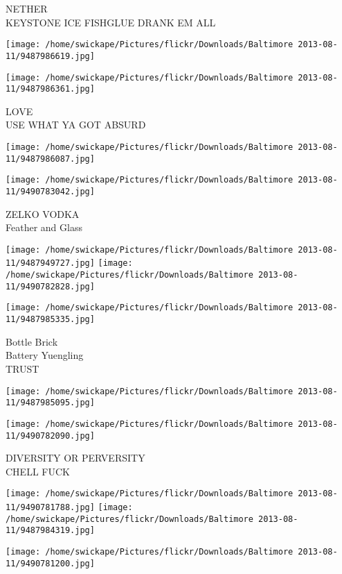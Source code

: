 \documentclass[10pt,letterpaper]{article}
\begin{document}
NETHER\\
KEYSTONE ICE FISHGLUE DRANK EM ALL
\pagebreak

\texttt{[image: /home/swickape/Pictures/flickr/Downloads/Baltimore 2013-08-11/9487986619.jpg]}

\vspace{0.25in}
\texttt{[image: /home/swickape/Pictures/flickr/Downloads/Baltimore 2013-08-11/9487986361.jpg]}

LOVE\\
USE WHAT YA GOT ABSURD
\pagebreak

\texttt{[image: /home/swickape/Pictures/flickr/Downloads/Baltimore 2013-08-11/9487986087.jpg]}

\vspace{0.25in}
\texttt{[image: /home/swickape/Pictures/flickr/Downloads/Baltimore 2013-08-11/9490783042.jpg]}

ZELKO VODKA\\
Feather and Glass
\pagebreak

\texttt{[image: /home/swickape/Pictures/flickr/Downloads/Baltimore 2013-08-11/9487949727.jpg]}
\texttt{[image: /home/swickape/Pictures/flickr/Downloads/Baltimore 2013-08-11/9490782828.jpg]}

\vspace{0.25in}
\texttt{[image: /home/swickape/Pictures/flickr/Downloads/Baltimore 2013-08-11/9487985335.jpg]}

Bottle Brick\\
Battery Yuengling\\
TRUST
\pagebreak

\texttt{[image: /home/swickape/Pictures/flickr/Downloads/Baltimore 2013-08-11/9487985095.jpg]}

\vspace{0.25in}
\texttt{[image: /home/swickape/Pictures/flickr/Downloads/Baltimore 2013-08-11/9490782090.jpg]}

DIVERSITY OR PERVERSITY\\
CHELL FUCK
\pagebreak

\texttt{[image: /home/swickape/Pictures/flickr/Downloads/Baltimore 2013-08-11/9490781788.jpg]}
\texttt{[image: /home/swickape/Pictures/flickr/Downloads/Baltimore 2013-08-11/9487984319.jpg]}

\vspace{0.25in}
\texttt{[image: /home/swickape/Pictures/flickr/Downloads/Baltimore 2013-08-11/9490781200.jpg]}
\end{document}
